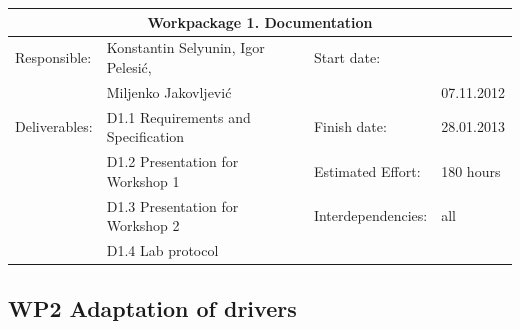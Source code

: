 \documentclass{scrreprt}
\begin{document}
\vspace{0.2in}
\begin{tabular}{|ll|ll|}
\hline \multicolumn{4}{|c|}{\textbf{Workpackage 1. Documentation}}\\
\hline
Responsible:	&  Konstantin Selyunin, Igor Pelesi\'c,	& Start date:		&  \\
                &  Miljenko Jakovljevi\'c               &                       & 07.11.2012 \\           
Deliverables:	&  D1.1 Requirements and Specification  & Finish date:	 	& 28.01.2013\\
		&  D1.2 Presentation for Workshop 1	& Estimated Effort: 	& 180 hours \\
		&  D1.3 Presentation for Workshop 2	& Interdependencies:	& all	\\
		&  D1.4 Lab protocol			& 			& 	\\
\hline
\end{tabular}

	\subsection{WP2 Adaptation of drivers}
\end{document}
